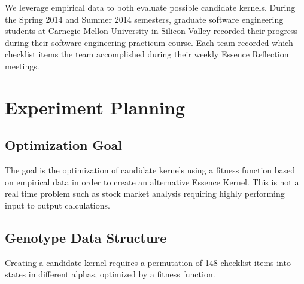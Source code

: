 \documentclass[preprint,12pt,3p]{elsarticle}
\begin{document}
We leverage empirical data to both evaluate possible candidate kernels. During the Spring 2014 and Summer 2014 semesters, graduate software engineering students at Carnegie Mellon University in Silicon Valley recorded their progress during their software engineering practicum course. Each team recorded which checklist items the team accomplished during their weekly Essence Reflection meetings. 


\section{Experiment Planning}
\subsection{Optimization Goal}
\label{Optimization Application}
The goal is the optimization of candidate kernels using a fitness function based on empirical data in order to create an alternative Essence Kernel. This is not a real time problem such as stock market analysis requiring highly performing input to output calculations.


\subsection{Genotype Data Structure}

Creating a candidate kernel requires a permutation of 148 checklist items into states in different alphas, optimized by a fitness function.

\end{document}
